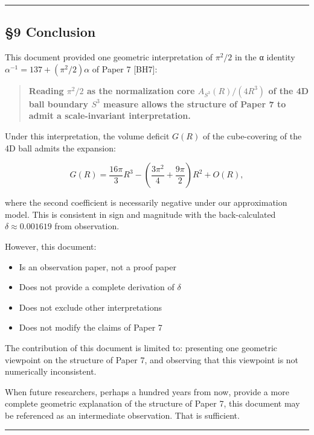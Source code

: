 \documentclass[
]{article}
\providecommand{\tightlist}{%
  \setlength{\itemsep}{0pt}\setlength{\parskip}{0pt}}
\begin{document}
\begin{center}\rule{0.5\linewidth}{0.5pt}\end{center}

\subsection{§9 Conclusion}\label{conclusion}

This document provided one geometric interpretation of \(\pi^2/2\) in
the α identity \(\alpha^{-1} = 137 + (\pi^2/2)\alpha\) of Paper 7
{[}BH7{]}:

\begin{quote}
\textbf{Reading \(\pi^2/2\) as the normalization core
\(A_{S^3}(R)/(4R^3)\) of the 4D ball boundary \(S^3\) measure allows the
structure of Paper 7 to admit a scale-invariant interpretation.}
\end{quote}

Under this interpretation, the volume deficit \(G(R)\) of the
cube-covering of the 4D ball admits the expansion:

\[G(R) = \frac{16\pi}{3}R^3 - \left(\frac{3\pi^2}{4} + \frac{9\pi}{2}\right)R^2 + O(R),\]

where the second coefficient is necessarily negative under our
approximation model. This is consistent in sign and magnitude with the
back-calculated \(\delta \approx 0.001619\) from observation.

However, this document:

\begin{itemize}
\tightlist
\item
  Is an observation paper, not a proof paper
\item
  Does not provide a complete derivation of \(\delta\)
\item
  Does not exclude other interpretations
\item
  Does not modify the claims of Paper 7
\end{itemize}

The contribution of this document is limited to: presenting one
geometric viewpoint on the structure of Paper 7, and observing that this
viewpoint is not numerically inconsistent.

When future researchers, perhaps a hundred years from now, provide a
more complete geometric explanation of the structure of Paper 7, this
document may be referenced as an intermediate observation. That is
sufficient.

\begin{center}\rule{0.5\linewidth}{0.5pt}\end{center}
\end{document}

